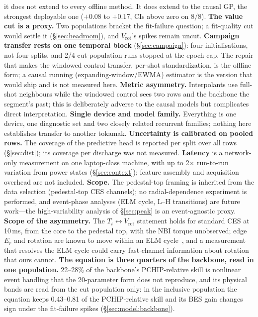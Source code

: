 \documentclass[10pt]{article}
\newcommand{\Ti}{\ensuremath{T_i}}
\newcommand{\Vrot}{\ensuremath{V_\mathrm{rot}}}
\begin{document}
it does not extend to every offline method. It does extend to the causal GP, the
strongest deployable one ($+0.08$ to $+0.17$, CIs above zero on 8/8).
\textbf{The value cut is a proxy.} Two populations bracket the fit-failure
question; a fit-quality cut would settle it (\S\ref{sec:headroom}), and \Vrot{}'s
spikes remain uncut.
\textbf{Campaign transfer rests on one temporal block} (\S\ref{sec:campaign}):
four initialisations, not four splits, and 2/4 cut-population runs stopped at the
epoch cap. The repair that makes the windowed control transfer, per-shot
standardization, is the offline form; a causal running (expanding-window/EWMA)
estimator is the version that would ship and is not measured here.
\textbf{Metric asymmetry.} Interpolants use full-shot neighbours while the
windowed control sees two rows and the backbone the segment's past; this is
deliberately adverse to the causal models but complicates direct interpretation.
\textbf{Single device and model family.} Everything is one device, one diagnostic
set and two closely related recurrent families; nothing here establishes transfer
to another tokamak.
\textbf{Uncertainty is calibrated on pooled rows.} The coverage of the predictive
head is reported per split over all rows (\S\ref{sec:dist}); its coverage per
discharge was not measured.
\textbf{Latency} is a network-only measurement on one laptop-class machine, with
up to 2$\times$ run-to-run variation from power states (\S\ref{sec:context});
feature assembly and acquisition overhead are not included.
\textbf{Scope.} The pedestal-top framing is inherited from the data selection
(pedestal-top CES channels); no radial-dependence experiment is performed, and
event-phase analyses (ELM cycle, L--H transitions) are future work---the
high-variability analysis of \S\ref{sec:peak} is an event-agnostic proxy.
\textbf{Scope of the asymmetry.} The \Ti$\leftrightarrow$\Vrot{} statement holds for
standard CES at 10\,ms, from the core to the pedestal top, with the NBI torque
unobserved; edge $E_r$ and rotation are known to move within an ELM
cycle~\citep{Viezzer2020Dynamics,Cavedon2017Pedestal}, and a measurement that resolves
the ELM cycle could carry fast-channel information about rotation that ours cannot.
\textbf{The equation is three quarters of the backbone, read in one population.}
22--28\% of the backbone's PCHIP-relative skill is nonlinear event handling that the
20-parameter form does not reproduce, and its physical bands are read from the cut
population only: in the inclusive population the equation keeps 0.43--0.81 of the
PCHIP-relative skill and its BES gain changes sign under the fit-failure spikes
(\S\ref{sec:model:backbone}).
\end{document}
